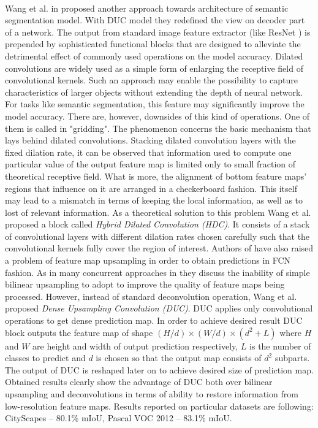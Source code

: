 \documentclass{article}
\begin{document}
\paragraph{}
Wang et al. in \cite{duc} proposed another approach towards architecture of semantic segmentation model. With DUC model they redefined the view on decoder part of a network. The output from standard image feature extractor (like ResNet \cite{resnet}) is prepended by sophisticated functional blocks that are designed to alleviate the detrimental effect of commonly used operations on the model accuracy. Dilated convolutions are widely used as a simple form of enlarging the receptive field of convolutional kernels. Such an approach may enable the possibility to capture characteristics of larger objects without extending the depth of neural network. For tasks like semantic segmentation, this feature may significantly improve the model accuracy. There are, however, downsides of this kind of operations. One of them is called in \cite{duc} "gridding". The phenomenon concerns the basic mechanism that lays behind dilated convolutions. Stacking dilated convolution layers with the fixed dilation rate, it can be observed that information used to compute one particular value of the output feature map is limited only to small fraction of theoretical receptive field. What is more, the alignment of bottom feature maps' regions that influence on it are arranged in a checkerboard fashion. This itself may lead to a mismatch in terms of keeping the local information, as well as to lost of relevant information. As a theoretical solution to this problem Wang et al. proposed a block called \textit{Hybrid Dilated Convolution (HDC)}. It consists of a stack of convolutional layers with different dilation rates chosen carefully such that the convolutional kernels fully cover the region of interest. Authors of \cite{duc} have also raised a problem of feature map upsampling in order to obtain predictions in FCN fashion. As in many concurrent approaches \cite{psp, inception-resnet, icnet} in they discuss the inability of simple bilinear upsampling to adopt to improve the quality of feature maps being processed. However, instead of standard deconvolution operation, Wang et al. proposed \textit{Dense Upsampling Convolution (DUC)}. DUC applies only convolutional operations to get dense prediction map. In order to achieve desired result DUC block outputs the feature map of shape $(H/d) \times (W/d) \times (d^2 + L)$ where $H$ and $W$ are height and width of output prediction respectively, $L$ is the number of classes to predict and $d$ is chosen so that the output map consists of $d^2$ subparts. The output of DUC is reshaped later on to achieve desired size of prediction map. Obtained results clearly show the advantage of DUC both over bilinear upsampling and deconvolutions in terms of ability to restore information from low-resolution feature maps. Results reported on particular datasets are following: CityScapes \cite{cityscapes} -- 80.1\% mIoU, Pascal VOC 2012 \cite{pascal_voc} -- 83.1\% mIoU. 
\end{document}
